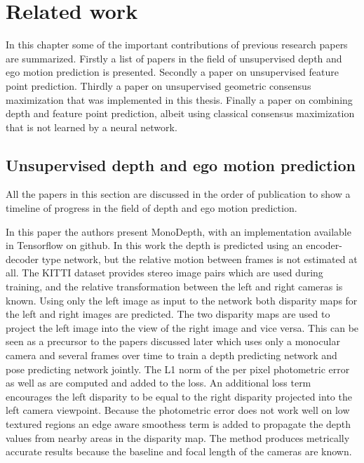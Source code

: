 \chapter{Related work}\label{cha:relatedwork}


In this chapter some of the important contributions of previous research papers are summarized. Firstly a list of papers in the field of unsupervised depth and ego motion prediction is presented. Secondly a paper on unsupervised feature point prediction. Thirdly a paper on unsupervised geometric consensus maximization that was implemented in this thesis. Finally a paper on combining depth and feature point prediction, albeit using classical consensus maximization that is not learned by a neural network.

\section{Unsupervised depth and ego motion prediction}
\label{sec:rldepth}

All the papers in this section are discussed in the order of publication to show a timeline of progress in the field of depth and ego motion prediction.


In this paper\cite{leftright} the authors present MonoDepth, with an implementation available in Tensorflow on github. In this work the depth is predicted using an encoder-decoder type network, but the relative motion between frames is not estimated at all. The KITTI dataset provides stereo image pairs which are used during training, and the relative transformation between the left and right cameras is known. Using only the left image as input to the network both disparity maps for the left and right images are predicted. The two disparity maps are used to project the left image into the view of the right image and vice versa. This can be seen as a precursor to the papers discussed later which uses only a monocular camera and several frames over time to train a depth predicting network and pose predicting network jointly. The L1 norm of the per pixel photometric error as well as \abbrSSIM\cite{ssim} are computed and added to the loss. An additional loss term encourages the left disparity to be equal to the right disparity projected into the left camera viewpoint. Because the photometric error does not work well on low textured regions an edge aware smoothess term is added to propagate the depth values from nearby areas in the disparity map. The method produces metrically accurate results because the baseline and focal length of the cameras are known.

